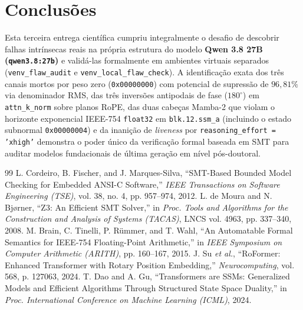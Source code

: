\documentclass[11pt,a4paper]{article}
\theoremstyle{definition}
\begin{document}
\section{Conclusões}

Esta terceira entrega científica cumpriu integralmente o desafio de descobrir falhas intrínsecas reais na própria estrutura do modelo \textbf{Qwen 3.8 27B (\texttt{qwen3.8:27b})} e validá-las formalmente em ambientes virtuais separados (\texttt{venv\_flaw\_audit} e \texttt{venv\_local\_flaw\_check}). A identificação exata dos três canais mortos por peso zero (\texttt{0x00000000}) com potencial de supressão de $96{,}81\%$ via denominador RMS, das três inversões antipodais de fase ($180^\circ$) em \texttt{attn\_k\_norm} sobre planos RoPE, das duas cabeças Mamba-2 que violam o horizonte exponencial IEEE-754 \texttt{float32} em \texttt{blk.12.ssm\_a} (incluindo o estado subnormal \texttt{0x00000004}) e da inanição de \textit{liveness} por \texttt{reasoning\_effort = 'xhigh'} demonstra o poder único da verificação formal baseada em SMT para auditar modelos fundacionais de última geração em nível pós-doutoral.

\vspace{0.5cm}
\begin{thebibliography}{99}
\footnotesize
{} L. Cordeiro, B. Fischer, and J. Marques-Silva, ``SMT-Based Bounded Model Checking for Embedded ANSI-C Software,'' \textit{IEEE Transactions on Software Engineering (TSE)}, vol. 38, no. 4, pp. 957--974, 2012.
 L. de Moura and N. Bj{\o}rner, ``Z3: An Efficient SMT Solver,'' in \textit{Proc. Tools and Algorithms for the Construction and Analysis of Systems (TACAS)}, LNCS vol. 4963, pp. 337--340, 2008.
 M. Brain, C. Tinelli, P. R{\"u}mmer, and T. Wahl, ``An Automatable Formal Semantics for IEEE-754 Floating-Point Arithmetic,'' in \textit{IEEE Symposium on Computer Arithmetic (ARITH)}, pp. 160--167, 2015.
 J. Su \textit{et al.}, ``RoFormer: Enhanced Transformer with Rotary Position Embedding,'' \textit{Neurocomputing}, vol. 568, p. 127063, 2024.
 T. Dao and A. Gu, ``Transformers are SSMs: Generalized Models and Efficient Algorithms Through Structured State Space Duality,'' in \textit{Proc. International Conference on Machine Learning (ICML)}, 2024.
\end{thebibliography}
\end{document}
